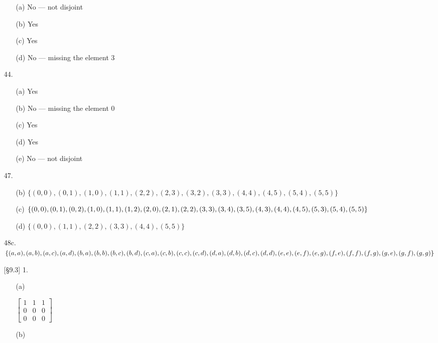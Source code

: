 \documentclass{article}
\begin{document}
\begin{enumerate}
        \begin{itemize}
            \item[(a)] No --- not disjoint
            \item[(b)] Yes
            \item[(c)] Yes
            \item[(d)] No --- missing the element $3$
        \end{itemize}
    \item[44.]
        \begin{itemize}
            \item[(a)] Yes
            \item[(b)] No --- missing the element $0$
            \item[(c)] Yes
            \item[(d)] Yes
            \item[(e)] No --- not disjoint
        \end{itemize}
    \item[47.]
        \begin{itemize}
            \item[(b)] $\{ (0,0), (0,1), (1,0), (1,1), (2,2), (2,3), (3,2), (3,3), (4,4), (4,5), (5,4), (5,5) \}$
            \item[(c)] $\{ (0,0), (0,1), (0,2), (1,0), (1,1), (1,2), (2,0), (2,1), (2,2), (3,3), (3,4), (3,5), (4,3), (4,4), \\ (4,5), (5,3), (5,4), (5,5) \}$
            \item[(d)] $\{ (0,0), (1,1), (2,2), (3,3), (4,4), (5,5) \}$
        \end{itemize}
    \item[48c.] $\{ (a,a), (a,b), (a,c), (a,d), (b,a), (b,b), (b,c), (b,d), (c,a), (c,b), (c,c), (c,d), (d,a), (d,b), (d,c), \\ (d,d), (e,e), (e,f), (e,g), (f,e), (f,f), (f,g), (g,e), (g,f), (g,g) \}$
    \item[{[\S 9.3]} 1.]
        \begin{itemize}
            \item[(a)] \hfill

            \vspace{-0.1in}
                $\begin{bmatrix}
                1 & 1 & 1 \\
                0 & 0 & 0 \\
                0 & 0 & 0
                \end{bmatrix}$
            \item[(b)] \hfill


\end{itemize}
\end{enumerate}
\end{document}

